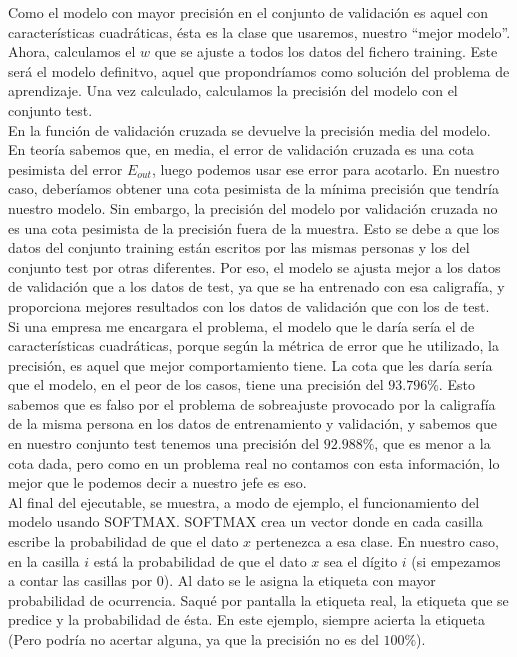 \documentclass{article}
\begin{document}
Como el modelo con mayor precisión en el conjunto de validación es aquel con características cuadráticas, ésta es la clase que usaremos, nuestro ``mejor modelo''. Ahora, calculamos el $w$ que se ajuste a todos los datos del fichero training. Este será el modelo definitvo, aquel que propondríamos como solución del problema de aprendizaje. Una vez calculado, calculamos la precisión del modelo con el conjunto test.\\

En la función de validación cruzada se devuelve la precisión media del modelo. En teoría sabemos que, en media, el error de validación cruzada es una cota pesimista del error $E_{out}$, luego podemos usar ese error para acotarlo. En nuestro caso, deberíamos obtener una cota pesimista de la mínima precisión que tendría nuestro modelo. Sin embargo, la precisión del modelo por validación cruzada no es una cota pesimista de la precisión fuera de la muestra. Esto se debe a que los datos del conjunto training están escritos por las mismas personas y los del conjunto test por otras diferentes. Por eso, el modelo se ajusta mejor a los datos de validación que a los datos de test, ya que se ha entrenado con esa caligrafía, y proporciona mejores resultados con los datos de validación que con los de test.\\

Si una empresa me encargara el problema, el modelo que le daría sería el de características cuadráticas, porque según la métrica de error que he utilizado, la precisión, es aquel que mejor comportamiento tiene. La cota que les daría sería que el modelo, en el peor de los casos, tiene una precisión del $93.796\%$. Esto sabemos que es falso por el problema de sobreajuste provocado por la caligrafía de la misma persona en los datos de entrenamiento y validación, y sabemos que en nuestro conjunto test tenemos una precisión del $92.988\%$, que es menor a la cota dada, pero como en un problema real no contamos con esta información, lo mejor que le podemos decir a nuestro jefe es eso.\\

Al final del ejecutable, se muestra, a modo de ejemplo, el funcionamiento del modelo usando SOFTMAX. SOFTMAX crea un vector donde en cada casilla escribe la probabilidad de que el dato $x$ pertenezca a esa clase. En nuestro caso, en la casilla $i$ está la probabilidad de que el dato $x$ sea el dígito $i$ (si empezamos a contar las casillas por $0$). Al dato se le asigna la etiqueta con mayor probabilidad de ocurrencia. Saqué por pantalla la etiqueta real, la etiqueta que se predice y la probabilidad de ésta. En este ejemplo, siempre acierta la etiqueta (Pero podría no acertar alguna, ya que la precisión no es del $100\%$).
\end{document}
